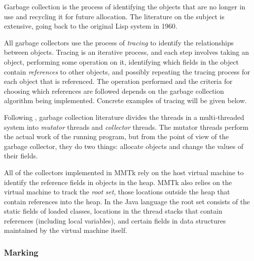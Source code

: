 Garbage collection is the process of identifying the objects that are no longer in use and 
recycling it for future allocation.  The literature on the subject is extensive, going back to
the original Lisp system in 1960.

All garbage collectors use the process of \emph{tracing} to identify the relationships between 
objects.  Tracing is an iterative process, and each step involves taking an object, 
performing some operation on it, identifying
which fields in the object contain \emph{references} to other objects, and possibly repeating 
the tracing process for each object that is referenced.  The operation performed and the criteria
for choosing which references are followed depends on the garbage collection algorithm being 
implemented.  Concrete examples of tracing will be given below.

Following \citet{DLM+:76}, garbage collection literature divides the threads in a multi-threaded
system into \emph{mutator} threads and \emph{collector} threads.  The mutator threads perform the actual
work of the running program, but from the point of view of the garbage collector, they do two
things: allocate objects and change the values of their fields.

All of the collectors implemented in MMTk rely on the host virtual machine to identify the 
reference fields in objects in the heap.  MMTk also relies on the virtual machine to track the
\emph{root set}, those locations outside the heap that contain references into the heap.  In 
the Java language the root set consists of the static fields of loaded classes,  
locations in the thread stacks that contain references (including local variables), and certain
fields in data structures maintained by the virtual machine itself.

\subsubsection{Marking}

